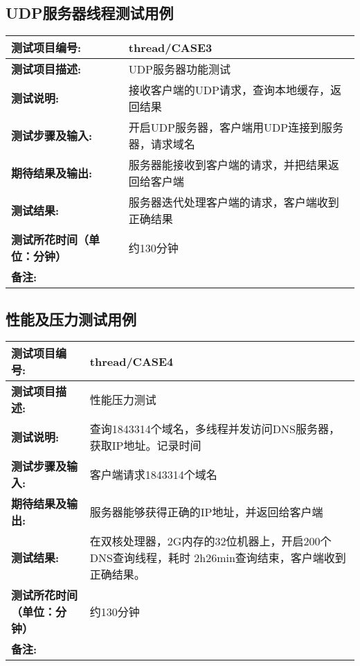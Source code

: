 \subsection {UDP服务器线程测试用例}
\begin{table}[H]
\centering
\begin{tabular}{|p{8em}|p{22em}|}
\hline
\textbf{测试项目编号:}&thread/CASE3\\
\hline
\textbf{测试项目描述:}&UDP服务器功能测试\\
\hline
\textbf{测试说明:}&接收客户端的UDP请求，查询本地缓存，返回结果\\
\hline
\textbf{测试步骤及输入:}&开启UDP服务器，客户端用UDP连接到服务器，请求域名\\
\hline
\textbf{期待结果及输出:}&服务器能接收到客户端的请求，并把结果返回给客户端\\
\hline
\textbf{测试结果:}&服务器迭代处理客户端的请求，客户端收到正确结果\\
\hline
\textbf{测试所花时间（单位：分钟）}& 约130分钟\\
\hline
\textbf{备注:}& \\
\hline
\end{tabular}
\end{table}


\subsection{性能及压力测试用例}
\begin{table}[H]
\centering
\begin{tabular}{|p{8em}|p{22em}|}
\hline
\textbf{测试项目编号:}&thread/CASE4\\
\hline
\textbf{测试项目描述:}&性能压力测试\\
\hline
\textbf{测试说明:}&查询1843314个域名，多线程并发访问DNS服务器，获取IP地址。记录时间\\
\hline
\textbf{测试步骤及输入:}&客户端请求1843314个域名\\
\hline
\textbf{期待结果及输出:}&服务器能够获得正确的IP地址，并返回给客户端\\
\hline
\textbf{测试结果:}& 在双核处理器，2G内存的32位机器上，开启200个DNS查询线程，耗时
2h26min查询结束，客户端收到正确结果。\\
\hline
\textbf{测试所花时间（单位：分钟）}& 约130分钟\\
\hline
\textbf{备注:}& \\
\hline
\end{tabular}
\end{table}


